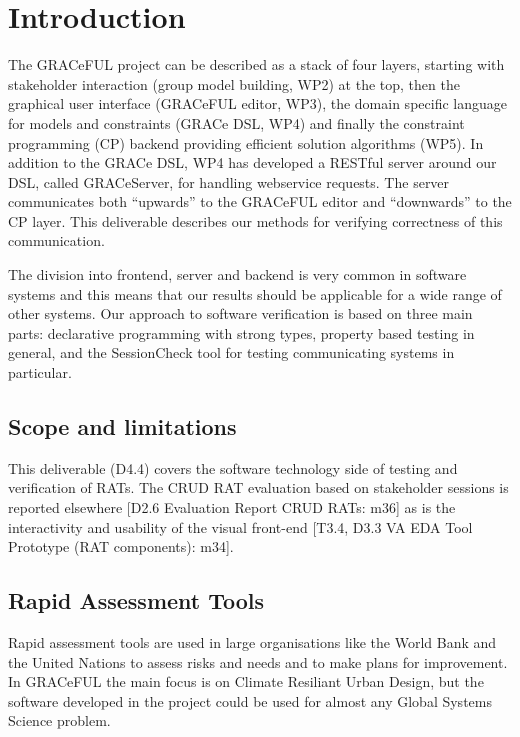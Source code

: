 \documentclass{article}
\begin{document}
\section{Introduction}
\label{sec:intro}

The GRACeFUL project can be described as a stack of four layers,
starting with stakeholder interaction (group model building, WP2) at
the top, then the graphical user interface (GRACeFUL editor, WP3), the
domain specific language for models and constraints (GRACe DSL, WP4)
and finally the constraint programming (CP) backend providing
efficient solution algorithms (WP5).
%
In addition to the GRACe DSL, WP4 has developed a RESTful server around our DSL,
called GRACeServer, for handling webservice requests. The server communicates
both ``upwards'' to the GRACeFUL editor and ``downwards'' to the CP layer.
%
This deliverable describes our methods for verifying correctness of
this communication.

The division into frontend, server and backend is very common in
software systems and this means that our results should be applicable
for a wide range of other systems.
%
Our approach to software verification is based on three main parts:
%
declarative programming with strong types, property based testing in
general, and the SessionCheck tool for testing communicating systems
in particular.

\subsection{Scope and limitations}

This deliverable (D4.4) covers the software technology side of testing
and verification of RATs.
%
The CRUD RAT evaluation based on stakeholder sessions is reported
elsewhere [D2.6 Evaluation Report CRUD RATs: m36] as is the
interactivity and usability of the visual front-end [T3.4, D3.3 VA EDA
Tool Prototype (RAT components): m34].

\subsection{Rapid Assessment Tools}

Rapid assessment tools are used in large organisations like the World
Bank and the United Nations to assess risks and needs and to make
plans for improvement.
In GRACeFUL the main focus is on Climate Resiliant Urban Design, but
the software developed in the project could be used for almost any
Global Systems Science problem.
\end{document}
